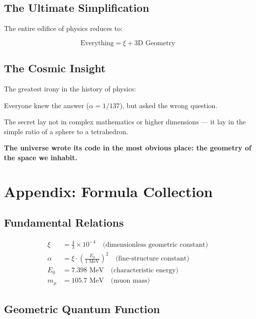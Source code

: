 	\subsection{The Ultimate Simplification}
	
	The entire edifice of physics reduces to:
	
	\begin{equation}
		\boxed{\text{Everything} = \xi + \text{3D Geometry}}
	\end{equation}
	
	\subsection{The Cosmic Insight}
	
	\begin{tcolorbox}[colback=red!5!white,colframe=red!75!black,title=Insight]
		The greatest irony in the history of physics:
		
		Everyone knew the answer ($\alpha = 1/137$), but asked the wrong question.
		
		The secret lay not in complex mathematics or higher dimensions — it lay in the simple ratio of a sphere to a tetrahedron.
		
		\textbf{The universe wrote its code in the most obvious place: the geometry of the space we inhabit.}
	\end{tcolorbox}
	
	\section{Appendix: Formula Collection}
	
	\subsection{Fundamental Relations}
	
	\begin{align}
		\xi &= \frac{4}{3} \times 10^{-4} \quad \text{(dimensionless geometric constant)}\\
		\alpha &= \xi \cdot \left(\frac{E_0}{1 \text{ MeV}}\right)^2 \quad \text{(fine-structure constant)}\\
		E_0 &= 7.398 \text{ MeV} \quad \text{(characteristic energy)}\\
		m_\mu &= 105.7 \text{ MeV} \quad \text{(muon mass)}
	\end{align}
	
	\subsection{Geometric Quantum Function}
	
